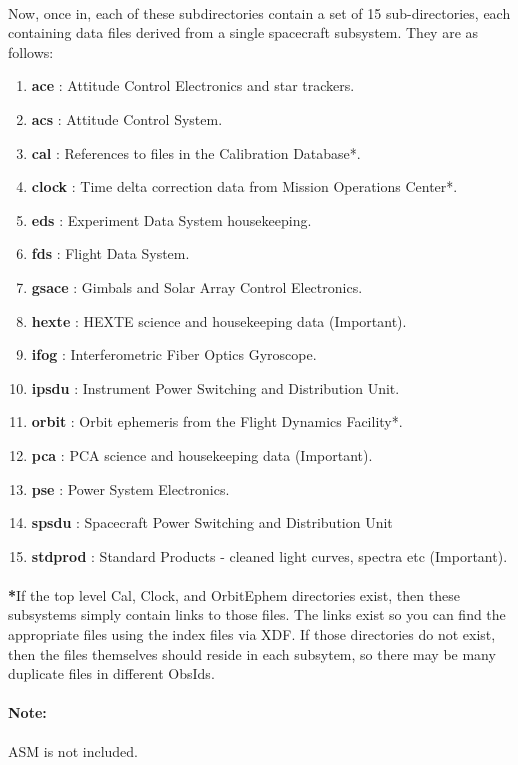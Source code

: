\documentclass[a4paper,twoside]{report}
\numberwithin{equation}{section}
\begin{document}
\paragraph{}
Now, once in, each of these subdirectories contain a set of 15 sub-directories, each containing data files derived from a single spacecraft subsystem. They are as follows:
\begin{enumerate}
\item \textbf{ace} : Attitude Control Electronics and star trackers.
\item \textbf{acs} : Attitude Control System.
\item \textbf{cal} : References to files in the Calibration Database*. 
\item \textbf{clock} : Time delta correction data from Mission Operations Center*.
\item \textbf{eds} : Experiment Data System housekeeping.
\item \textbf{fds} : Flight Data System.
\item \textbf{gsace} : Gimbals and Solar Array Control Electronics.
\item \textbf{hexte} : HEXTE science and housekeeping data (Important).
\item \textbf{ifog} : Interferometric Fiber Optics Gyroscope.
\item \textbf{ipsdu} : Instrument Power Switching and Distribution Unit.
\item \textbf{orbit} : Orbit ephemeris from the Flight Dynamics Facility*.
\item \textbf{pca} : PCA science and housekeeping data (Important). 
\item \textbf{pse} : Power System Electronics.
\item \textbf{spsdu} : Spacecraft Power Switching and Distribution Unit
\item \textbf{stdprod} : Standard Products - cleaned light curves, spectra etc (Important).
\end{enumerate}
\paragraph{}
\textbf{*}If the top level Cal, Clock, and OrbitEphem directories exist, then these subsystems simply contain links to those files. The links exist so you can find the appropriate files using the index files via XDF. If those directories do not exist, then the files themselves should reside in each subsytem, so there may be many duplicate files in different ObsIds.
\paragraph{Note:}
ASM is not included.
\end{document}
